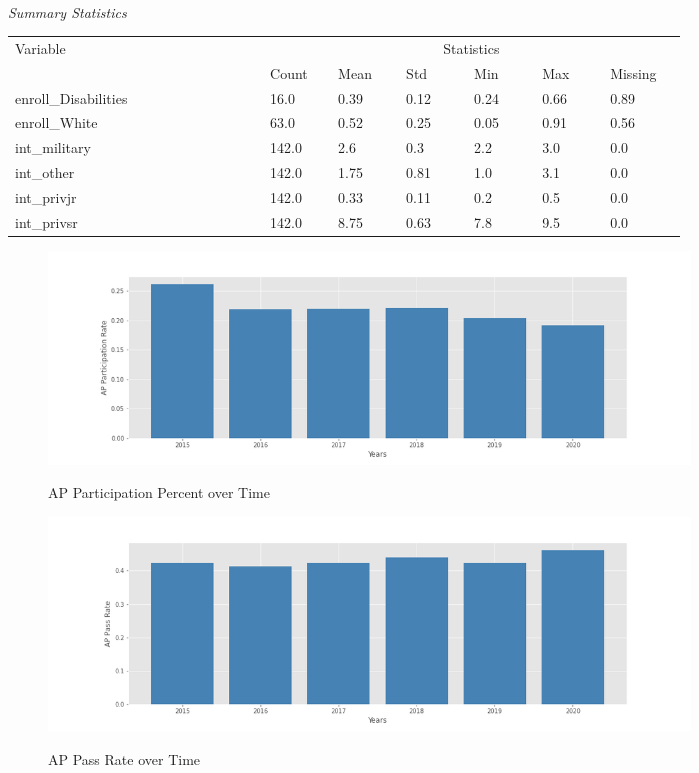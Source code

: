 \documentclass[10pt]{beamer}
\begin{document}
\begin{frame}
    \begin{threeparttable}
        \renewcommand\thetable{2}
        \caption{\\\textit{Summary Statistics}}
        \begin{tabular}{ p{0.3\linewidth} p{0.08\linewidth} p{0.08\linewidth} p{0.08\linewidth} p{0.08\linewidth} p{0.08\linewidth} p{0.09\linewidth}}
            \toprule
            Variable & \multicolumn{6}{c}{Statistics} \\
            \cmidrule(r){2-7}
            &    Count   &   Mean & Std & Min & Max & Missing  \\ 
            \midrule
            enroll\_Disabilities &  16.0  &  0.39 & 0.12 & 0.24 & 0.66 & 0.89  \\ 
            enroll\_White &  63.0  &  0.52 & 0.25 & 0.05 & 0.91 & 0.56  \\ 
            int\_military &  142.0  &  2.6 & 0.3 & 2.2 & 3.0 & 0.0  \\ 
            int\_other &  142.0  &  1.75 & 0.81 & 1.0 & 3.1 & 0.0  \\
            int\_privjr &  142.0  &  0.33 & 0.11 & 0.2 & 0.5 & 0.0  \\
            int\_privsr &  142.0  &  8.75 & 0.63 & 7.8 & 9.5 & 0.0  \\ 
            \midrule
        \end{tabular}
        \end{threeparttable}
\end{frame}

\begin{frame}{}
    \begin{figure}
        \caption{AP Participation Percent over Time}
        \includegraphics[width=17cm]{AP Participation Rate.png}
        \label{fig1}
    \end{figure}
\end{frame}

\begin{frame}{}
    \begin{figure}
        \caption{AP Pass Rate over Time}
        \includegraphics[width=17cm]{AP Pass Rate.png}
        \label{fig2}
    \end{figure}     
\end{frame}
    
\end{document}
